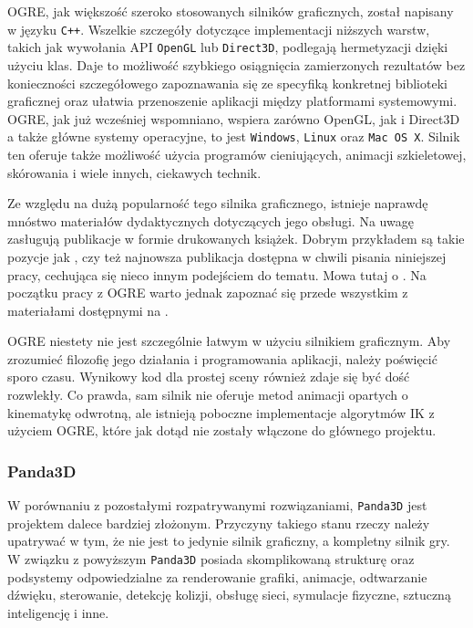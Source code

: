 \documentclass[11pt]{mwrep}
\begin{document}
      OGRE, jak większość szeroko stosowanych silników graficznych, został napisany w języku \texttt{C++}. Wszelkie szczegóły dotyczące implementacji niższych warstw, takich jak wywołania API \texttt{OpenGL} lub \texttt{Direct3D}, podlegają hermetyzacji dzięki użyciu klas. Daje to możliwość szybkiego osiągnięcia zamierzonych rezultatów bez konieczności szczegółowego zapoznawania się ze specyfiką konkretnej biblioteki graficznej oraz ułatwia przenoszenie aplikacji między platformami systemowymi. OGRE, jak już wcześniej wspomniano, wspiera zarówno OpenGL, jak i Direct3D a także główne systemy operacyjne, to jest \texttt{Windows}, \texttt{Linux} oraz \texttt{Mac OS X}. Silnik ten oferuje także możliwość użycia programów cieniujących, animacji szkieletowej, skórowania i wiele innych, ciekawych technik.

      Ze względu na dużą popularność tego silnika graficznego, istnieje naprawdę mnóstwo materiałów dydaktycznych dotyczących jego obsługi. Na uwagę zasługują publikacje w formie drukowanych książek. Dobrym przykładem są takie pozycje jak \cite{ogreb1}, czy też najnowsza publikacja dostępna w chwili pisania niniejszej pracy, cechująca się nieco innym podejściem do tematu. Mowa tutaj o \cite{ogreb2}. Na początku pracy z OGRE warto jednak zapoznać się przede wszystkim z materiałami dostępnymi na \cite{ogre}.


      OGRE niestety nie jest szczególnie łatwym w użyciu silnikiem graficznym. Aby zrozumieć filozofię jego działania i programowania aplikacji, należy poświęcić sporo czasu. Wynikowy kod dla prostej sceny również zdaje się być dość rozwlekły. Co prawda, sam silnik nie oferuje metod animacji opartych o kinematykę odwrotną, ale istnieją poboczne implementacje algorytmów IK z użyciem OGRE, które jak dotąd nie zostały włączone do głównego projektu.

      \subsubsection{Panda3D}

      W porównaniu z pozostałymi rozpatrywanymi rozwiązaniami, \texttt{Panda3D} jest projektem dalece bardziej złożonym. Przyczyny takiego stanu rzeczy należy upatrywać w tym, że nie jest to jedynie silnik graficzny, a kompletny silnik gry. W związku z powyższym \texttt{Panda3D} posiada skomplikowaną strukturę oraz podsystemy odpowiedzialne za renderowanie grafiki, animacje, odtwarzanie dźwięku, sterowanie, detekcję kolizji, obsługę sieci, symulacje fizyczne, sztuczną inteligencję i inne.
\end{document}
